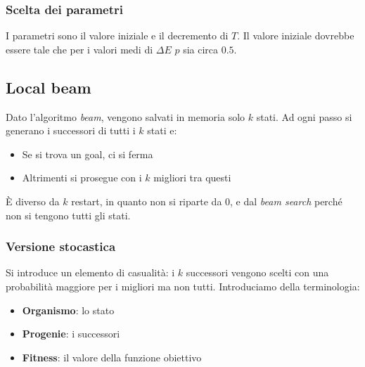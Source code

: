 \subsubsection{Scelta dei parametri}
I parametri sono il valore iniziale e il decremento di $T$. Il valore iniziale dovrebbe essere tale che per i valori medi di $\Delta E$ $p$ sia circa $0.5$.

\subsection{Local beam}
Dato l'algoritmo \emph{beam}, vengono salvati in memoria solo $k$ stati. Ad ogni passo si generano i successori di tutti i $k$ stati e:
\begin{itemize}
	\item Se si trova un goal, ci si ferma
	\item Altrimenti si prosegue con i $k$ migliori tra questi
\end{itemize}
\begin{note}
	È diverso da $k$ restart, in quanto non si riparte da $0$, e dal \emph{beam search} perché non si tengono tutti gli stati.
\end{note}
\subsubsection{Versione stocastica}
Si introduce un elemento di casualità: i $k$ successori vengono scelti con una probabilità maggiore per i migliori ma non tutti.
Introduciamo della terminologia:
\begin{itemize}
	\item \textbf{Organismo}: lo stato
	\item \textbf{Progenie}: i successori
	\item \textbf{Fitness}: il valore della funzione obiettivo
\end{itemize}

